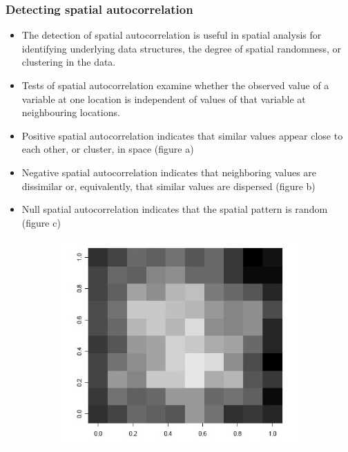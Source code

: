\documentclass[12pt]{beamer}
\begin{document}
\begin{frame}
\frametitle{Detecting spatial autocorrelation}
\begin{itemize} \setlength\itemsep{\fill}
\item  The detection of spatial autocorrelation is useful in spatial analysis for identifying underlying data structures, the degree of spatial randomness, or clustering in the data.
\item  Tests of spatial autocorrelation examine whether the observed value of a variable at one location is independent of values of that variable at neighbouring locations.
\end{itemize}
\end{frame}

\begin{frame}
\begin{itemize} \setlength\itemsep{\fill}
\item  \alert{Positive spatial autocorrelation} indicates that similar values appear close to each other, or cluster, in space (figure a)
\item  \alert{Negative spatial autocorrelation} indicates that neighboring values are dissimilar or, equivalently, that similar values are dispersed (figure b)
\item  \alert{Null spatial autocorrelation} indicates that the spatial pattern is random (figure c)
\end{itemize}
\begin{figure}
  \centering
  \begin{subfigure}[b]{0.26\linewidth}
    \includegraphics[width=\linewidth]{Pos_SpatCorr.jpg}

\end{subfigure}
\end{figure}
\end{frame}
\end{document}
